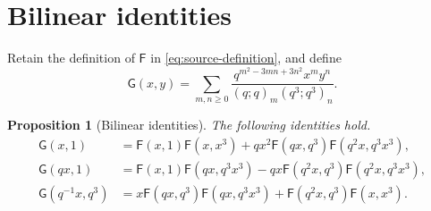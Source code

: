 \documentclass[11pt]{article}
\numberwithin{equation}{section}
\newtheorem{proposition}[theorem]{Proposition}
\theoremstyle{remark}
\begin{document}
\section{Bilinear identities}
\label{app:addition}

Retain the definition of \(\mathsf F\) in
\eqref{eq:source-definition}, and define
\[
 \mathsf G(x,y)=\sum_{m,n\geq0}
 \frac{q^{m^2-3mn+3n^2}x^my^n}{(q;q)_m(q^3;q^3)_n}.
\]

\begin{proposition}[Bilinear identities]\label{prop:app-addition}
The following identities hold.
\begin{align}
 \mathsf G(x,1)
 & =\mathsf F(x,1)\mathsf F(x,x^3)
       +qx^2\mathsf F(qx,q^3)\mathsf F(q^2x,q^3x^3),
       \label{eq:app-addition-0}\\
 \mathsf G(qx,1)
 & =\mathsf F(x,1)\mathsf F(qx,q^3x^3)
       -qx\mathsf F(q^2x,q^3)\mathsf F(q^2x,q^3x^3),
       \label{eq:app-addition-plus}\\
 \mathsf G(q^{-1}x,q^3)
 & =x\mathsf F(qx,q^3)\mathsf F(qx,q^3x^3)
       +\mathsf F(q^2x,q^3)\mathsf F(x,x^3).
       \label{eq:app-addition-minus}
\end{align}
\end{proposition}
\end{document}
